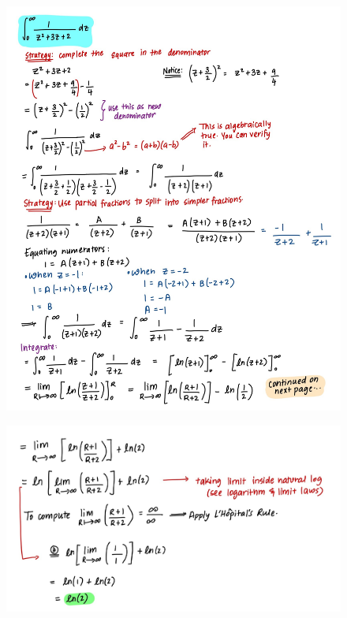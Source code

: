 \documentclass{article}
\begin{document}
\begin{enumerate}
\begin{figure}[H]
        \includegraphics[width=0.95\linewidth]{Q8.1.jpg}
        \label{fig:Q8.1}
    \end{figure}
    \begin{figure}[H]
        \centering
        \includegraphics[width=\linewidth]{Q8.2.jpg}
        \label{fig:Q8.2}
    \end{figure}
\end{enumerate}
\end{document}
